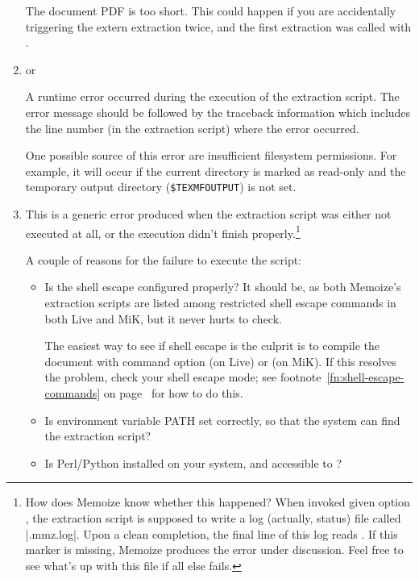 \documentclass[a4paper,11pt]{article}
\begin{document}
\begin{enumerate}
  The document PDF is too short. This could happen if you are accidentally
  triggering the extern extraction twice, and the first extraction was called
  with .

\item\label{item:error:runtime}  or 

  A runtime error occurred during the execution of the extraction script.  The
  error message should be followed by the traceback information which includes
  the line number (in the extraction script) where the error occurred.

  One possible source of this error are insufficient filesystem permissions.
  For example, it will occur if the current directory is marked as read-only
  and the temporary output directory (\texttt{\$TEXMFOUTPUT}) is not set.
  
\item {}

  This is a generic error produced when the extraction script was either not
  executed at all, or the execution didn't finish properly.\footnote{How does
    Memoize know whether this happened?  When invoked given option
    , the extraction script is supposed
    to write a log (actually, status) file called
    \mbox{}|.mmz.log|.  Upon a clean completion, the final line
    of this log reads .  If this marker is missing, Memoize
    produces the error under discussion.  Feel free to see what's up with this
    file if all else fails.}

  A couple of reasons for the failure to execute the script:
  \begin{itemize}
  \item Is the shell escape configured properly?  It should be, as both
    Memoize's extraction scripts are listed among restricted shell escape
    commands in both Live and MiK, but it never hurts
    to check.

    The easiest way to see if shell escape is the culprit is to compile the
    document with command option  (on Live)
    or  (on MiK).  If this resolves the
    problem, check your shell escape mode; see
    footnote~\ref{fn:shell-escape-commands} on
    page~\pageref{fn:shell-escape-commands} for how to do this.
  \item Is environment variable PATH set correctly, so that the system can find
    the extraction script?
  \item Is Perl\slash Python installed on your system, and accessible to
    ?
  \end{itemize}


\end{enumerate}
\end{document}
